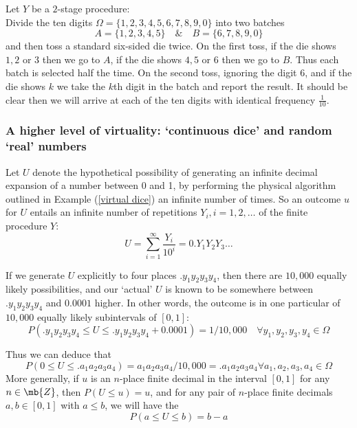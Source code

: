 \documentclass[11pt]{article}
\numberwithin{equation}{section}
\begin{document}
Let $Y$ be a $2$-stage procedure:\\
Divide the ten digits $\Omega = \{1, 2, 3, 4, 5, 6, 7, 8, 9, 0\}$ into two batches
\begin{equation}
	A = \{1, 2, 3, 4, 5\} \quad \& \quad B = \{6, 7, 8, 9, 0\}
\end{equation}
and then toss a standard six-sided die twice. On the first toss, if the die shows $1, 2$ or $3$ then we go to $A$, if the die shows $4,5$ or $6$ then we go to $B$. Thus each batch is selected half the time. On the second toss, ignoring the digit $6$, and if the die shows $k$ we take the $k$th digit in the batch and report the result. It should be clear then we will arrive at each of the ten digits with identical frequency $\frac{1}{10}$.


\subsubsection{A higher level of virtuality: `continuous dice' and random `real' numbers}

Let $U$ denote the hypothetical possibility of generating an infinite decimal expansion of a number between 0 and 1, by performing the physical algorithm outlined in Example (\ref{virtual dice}) an infinite number of times. So an outcome $u$ for $U$ entails an infinite number of repetitions $Y_i, i = 1, 2, \hdots$ of the finite procedure $Y$:
\begin{equation}
	U = \sum_{i = 1}^\infty \frac{Y_i}{10^i} = 0.Y_1Y_2Y_3 \hdots
\end{equation}

\example
If we generate $U$ explicitly to four places $.y_1y_2y_3y_4$, then there are $10,000$ equally likely possibilities, and our `actual' $U$ is known to be somewhere between $.y_1y_2y_3y_4$ and $0.0001$ higher. In other words, the outcome is in one particular of $10,000$ equally likely subintervals of $[0, 1]$:
\begin{equation}
	P(.y_1y_2y_3y_4 \leq U \leq .y_1y_2y_3y_4 + 0.0001) = 1/10,000 \quad \forall y_1, y_2, y_3, y_4 \in \Omega
\end{equation}

Thus we can deduce that
\begin{equation}
	P(0 \leq U \leq .a_1a_2a_3a_4) = a_1a_2a_3a_4 / 10,000 = .a_1a_2a_3a_4 \forall a_1, a_2, a_3, a_4 \in \Omega
\end{equation}
More generally, if $u$ is an $n$-place finite decimal in the interval $[0,1]$ for any $n \in \mb{Z}$, then $P(U \leq u) = u$, and for any pair of $n$-place finite decimals $a, b \in [0, 1]$ with $a \leq b$, we will have the  
\begin{equation}
	P(a \leq U \leq b) = b - a
\end{equation}
\end{document}
